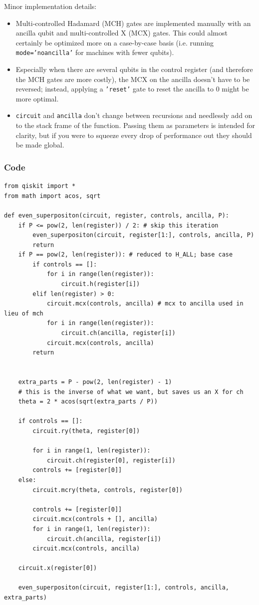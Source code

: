 \documentclass[12pt]{article}
\begin{document}
\vspace{10mm}
\noindent Minor implementation details:
\begin{itemize}
    \item Multi-controlled Hadamard (MCH) gates are implemented manually with an ancilla qubit and multi-controlled X (MCX) gates. This could almost certainly be optimized more on a case-by-case basis (i.e. running \texttt{mode='noancilla'} for machines with fewer qubits).
    \item Especially when there are several qubits in the control register (and therefore the MCH gates are more costly), the MCX on the ancilla doesn't have to be reversed; instead, applying a  \texttt{'reset'} gate to reset the ancilla to 0 might be more optimal.
    \item \texttt{circuit} and \texttt{ancilla} don't change between recursions and needlessly add on to the stack frame of the function. Passing them as parameters is intended for clarity, but if you were to squeeze every drop of performance out they should be made global.
\end{itemize}
\subsubsection{Code}
\begin{verbatim}
from qiskit import *
from math import acos, sqrt

def even_superpositon(circuit, register, controls, ancilla, P):
    if P <= pow(2, len(register)) / 2: # skip this iteration
        even_superpositon(circuit, register[1:], controls, ancilla, P)
        return
    if P == pow(2, len(register)): # reduced to H_ALL; base case
        if controls == []:
            for i in range(len(register)):
                circuit.h(register[i])
        elif len(register) > 0:
            circuit.mcx(controls, ancilla) # mcx to ancilla used in lieu of mch
            for i in range(len(register)):
                circuit.ch(ancilla, register[i])
            circuit.mcx(controls, ancilla)
        return


    extra_parts = P - pow(2, len(register) - 1)
    # this is the inverse of what we want, but saves us an X for ch
    theta = 2 * acos(sqrt(extra_parts / P))

    if controls == []:
        circuit.ry(theta, register[0])

        for i in range(1, len(register)):
            circuit.ch(register[0], register[i])
        controls += [register[0]]
    else:
        circuit.mcry(theta, controls, register[0])

        controls += [register[0]]
        circuit.mcx(controls + [], ancilla)
        for i in range(1, len(register)):
            circuit.ch(ancilla, register[i])
        circuit.mcx(controls, ancilla)

    circuit.x(register[0])

    even_superpositon(circuit, register[1:], controls, ancilla, extra_parts)
\end{verbatim}
\label{qrng}
\end{document}
